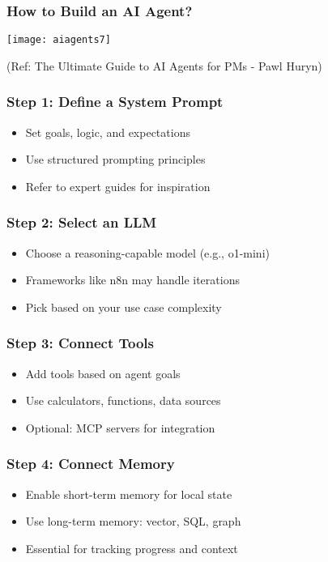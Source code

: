 \begin{frame}[fragile]\frametitle{How to Build an AI Agent?}

	\begin{center}
	\texttt{[image: aiagents7]}
	\end{center}
	
	{\tiny (Ref: The Ultimate Guide to AI Agents for PMs - Pawl Huryn)}
\end{frame}


\begin{frame}[fragile]\frametitle{Step 1: Define a System Prompt}
      \begin{itemize}
        \item Set goals, logic, and expectations
        \item Use structured prompting principles
        \item Refer to expert guides for inspiration
      \end{itemize}
\end{frame}

\begin{frame}[fragile]\frametitle{Step 2: Select an LLM}
      \begin{itemize}
        \item Choose a reasoning-capable model (e.g., o1-mini)
        \item Frameworks like n8n may handle iterations
        \item Pick based on your use case complexity
      \end{itemize}
\end{frame}

\begin{frame}[fragile]\frametitle{Step 3: Connect Tools}
      \begin{itemize}
        \item Add tools based on agent goals
        \item Use calculators, functions, data sources
        \item Optional: MCP servers for integration
      \end{itemize}
\end{frame}

\begin{frame}[fragile]\frametitle{Step 4: Connect Memory}
      \begin{itemize}
        \item Enable short-term memory for local state
        \item Use long-term memory: vector, SQL, graph
        \item Essential for tracking progress and context
      \end{itemize}
\end{frame}

